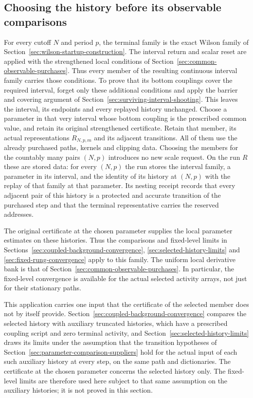 \subsection{Choosing the history before its observable comparisons}
For every cutoff $N$ and period $p$, the terminal family is the exact
Wilson family of Section~\ref{sec:wilson-startup-construction}.
The interval return and scalar reset are applied with the strengthened
local conditions of Section~\ref{sec:common-observable-purchases}.
Thus every member of the resulting continuous interval family carries
those conditions. To prove that its bottom couplings cover the required
interval, forget only these additional conditions and apply the barrier
and covering argument of Section~\ref{sec:surviving-interval-shooting}.
This leaves the interval, its endpoints and every replayed history
unchanged. Choose a parameter in that very interval whose bottom
coupling is the prescribed common value, and retain its original
strengthened certificate.
Retain that member, its actual representations $R_{N,p,m}$ and its
adjacent transitions. All of them use the already purchased paths,
kernels and clipping data. Choosing the members for the countably
many pairs $(N,p)$ introduces no new scale request. On the run $R$ these
are stored data: for every $(N,p)$ the run stores the interval family, a
parameter in its interval, and the identity of its history at $(N,p)$
with the replay of that family at that parameter. Its nesting receipt
records that every adjacent pair of this history is a protected and
accurate transition of the purchased step and that the terminal
representative carries the reserved addresses.

The original certificate at the chosen parameter supplies the local
parameter estimates on these histories. Thus the comparisons and fixed-level limits in
Sections~\ref{sec:coupled-background-convergence},
\ref{sec:selected-history-limits} and
\ref{sec:fixed-rung-convergence} apply to this family. The uniform
local derivative bank is that of
Section~\ref{sec:common-observable-purchases}. In particular, the
fixed-level convergence is available for the actual selected
activity arrays, not just for their stationary paths.

This application carries one input that the certificate of the
selected member does not by itself provide.
Section~\ref{sec:coupled-background-convergence} compares the selected
history with auxiliary truncated histories, which have a prescribed
coupling script and zero terminal activity, and
Section~\ref{sec:selected-history-limits} draws its limits under the
assumption that the transition hypotheses of
Section~\ref{sec:parameter-comparison-suppliers} hold for the actual
input of each such auxiliary history at every step, on the same path
and dictionaries. The certificate at the chosen parameter concerns
the selected history only. The fixed-level limits are therefore used
here subject to that same assumption on the auxiliary histories; it
is not proved in this section.

